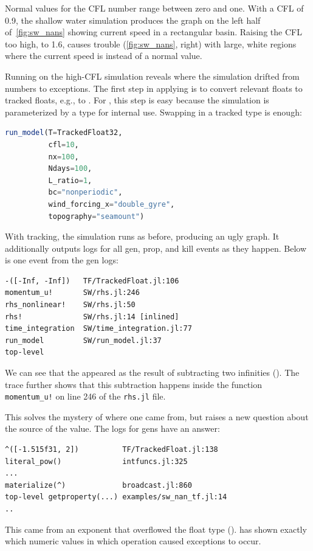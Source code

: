 \documentclass{juliacon}
\begin{document}
Normal values for the CFL number range between zero and one.
With a CFL of 0.9, the shallow water simulation produces the graph on the left half
of~\cref{fig:sw_nans} showing current speed in a rectangular basin.
Raising the CFL too high, to 1.6, causes trouble
(\cref{fig:sw_nans}, right) with large, white regions where the
current speed is \NaN{} instead of a normal value.

Running \TF{} on the high-CFL simulation reveals where the simulation drifted
from numbers to \NaN{} exceptions.
The first step in applying \TF{} is to convert relevant floats to tracked
floats, e.g.,  to .
For \ShallowWaters{}, this step is easy because the simulation is parameterized by
a \fp{} type for internal use.
Swapping in a tracked type is enough:

\begin{lstlisting}[language = Julia]
run_model(T=TrackedFloat32,
          cfl=10,
          nx=100,
          Ndays=100,
          L_ratio=1,
          bc="nonperiodic",
          wind_forcing_x="double_gyre",
          topography="seamount")
\end{lstlisting}

With tracking, the simulation runs as before, producing an ugly graph.
It additionally outputs logs for all gen, prop, and kill events
as they happen.
Below is one event from the gen logs:

\begin{lstlisting}
-([-Inf, -Inf])   TF/TrackedFloat.jl:106
momentum_u!       SW/rhs.jl:246
rhs_nonlinear!    SW/rhs.jl:50
rhs!              SW/rhs.jl:14 [inlined]
time_integration  SW/time_integration.jl:77
run_model         SW/run_model.jl:37
top-level
\end{lstlisting}

We can see that the \NaN{} appeared as the result of subtracting two infinities ().
The trace further shows that this subtraction happens inside the function \texttt{momentum\_u!} on line 246 of the \texttt{rhs.jl} file.

This solves the mystery of where one \NaN{} came from, but raises a new question
about the source of the \Inf{} value.
The logs for \Inf{} gens have an answer:

\begin{lstlisting}
^([-1.515f31, 2])          TF/TrackedFloat.jl:138
literal_pow()              intfuncs.jl:325
...
materialize(^)             broadcast.jl:860
top-level getproperty(...) examples/sw_nan_tf.jl:14
..
\end{lstlisting}
%
This \Inf{} came from an exponent that overflowed the float type ().
\TF{} has shown exactly which numeric values in which operation
caused exceptions to occur.
\end{document}
